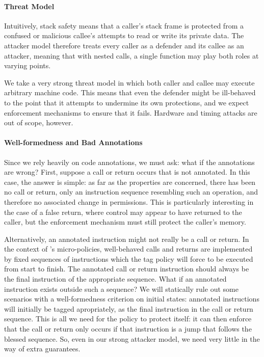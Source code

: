 \documentclass[acmsmall,review,anonymous]{acmart}\settopmatter{printfolios=true,printccs=false,printacmref=false}
\begin{document}
\paragraph*{Threat Model}

Intuitively, stack safety means that a caller's stack frame is protected
from a confused or malicious callee's attempts to read or write its private data.
The attacker model therefore treats every caller as a defender and its callee as
an attacker, meaning that with nested calls, a single function may play both roles
at varying points.

We take a very strong threat model in which both caller and callee may execute
arbitrary machine code. This means that even the defender might be ill-behaved
to the point that it attempts to undermine its own protections, and we expect
enforcement mechanisms to ensure that it fails.
Hardware and timing attacks are out of scope, however.

\paragraph*{Well-formedness and Bad Annotations}

Since we rely heavily on code annotations, we must ask: what if the annotations
are wrong? First, suppose a call or return occurs that is not annotated.
In this case, the answer is simple: as far as the properties are concerned, there has
been no call or return, only an instruction sequence resembling such an operation, and
therefore no associated change in permissions. This is particularly interesting in the
case of a false return, where control may appear to have returned to the caller, but
the enforcement mechanism must still protect the caller's memory.

Alternatively, an annotated instruction might not really be a call or return.
In the context of \citeauthor{DBLP:conf/sp/RoesslerD18}'s micro-policies, well-behaved calls
and returns are implemented by fixed sequences of instructions which the tag policy
will force to be executed from start to finish. The annotated call or return instruction should always
be the final instruction of the appropriate sequence. What if an annotated instruction exists outside
such a sequence? We will statically rule out some scenarios with a well-formedness criterion
on initial states: annotated instructions will initially be tagged apropriately, as the
final instruction in the call or return sequence. This is all we need for the policy to
protect itself: it can then enforce that the call or return only occurs if that instruction
is a jump that follows the blessed sequence. So, even in our strong attacker model, we need
very little in the way of extra guarantees.
\end{document}
